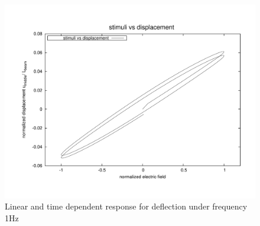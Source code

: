 \begin{figure}  
\centering
\includegraphics[width=6.0in]{./chap_5_active_trusses/images_non_linear_time_dependent_constitutive_equatio/linear_tetrahedral_time_dependent_efield_vs_displacement.pdf}
\caption{Linear and time dependent response for deflection under frequency 1Hz}
\label{fig:linear_tetrahedral_time_dependent_efield_vs_displacement}
\end{figure} 

